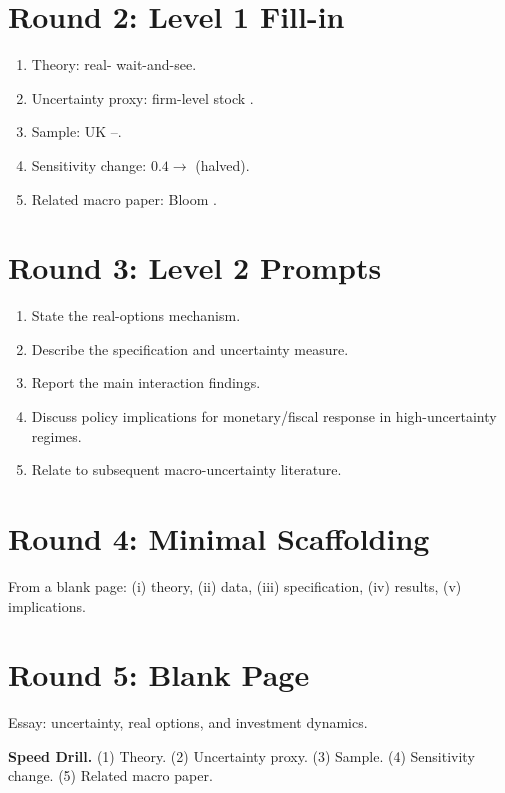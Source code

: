 \documentclass[11pt]{article}
\newcommand{\blank}[1]{\underline{\hspace{#1}}}
\begin{document}
\section*{Round 2: Level 1 Fill-in}
\begin{enumerate}
\item Theory: real-\blank{2cm} wait-and-see.
\item Uncertainty proxy: firm-level stock \blank{2cm}.
\item Sample: UK \blank{2cm} \blank{1cm}--\blank{1cm}.
\item Sensitivity change: $0.4\to$\blank{1cm} (halved).
\item Related macro paper: Bloom \blank{1cm}.
\end{enumerate}

\section*{Round 3: Level 2 Prompts}
\begin{enumerate}
\item State the real-options mechanism.
\item Describe the specification and uncertainty measure.
\item Report the main interaction findings.
\item Discuss policy implications for monetary/fiscal response in high-uncertainty regimes.
\item Relate to subsequent macro-uncertainty literature.
\end{enumerate}

\section*{Round 4: Minimal Scaffolding}
From a blank page: (i) theory, (ii) data, (iii) specification, (iv) results, (v) implications.

\section*{Round 5: Blank Page}
Essay: uncertainty, real options, and investment dynamics.

\vspace{6pt}
\begin{drillbox}
\textbf{Speed Drill.} (1) Theory. (2) Uncertainty proxy. (3) Sample. (4) Sensitivity change. (5) Related macro paper.
\end{drillbox}
\end{document}
